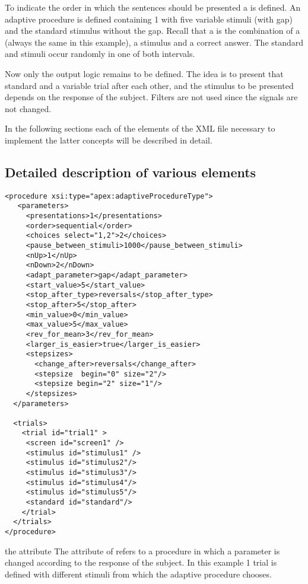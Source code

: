 To indicate the order in which the sentences should be presented a
 is defined. An adaptive procedure is defined
containing 1  with five variable stimuli (with
gap) and the standard stimulus without the gap. Recall that a
 is the combination of a  (always
the same in this example), a stimulus and a correct answer. The
standard and stimuli occur randomly in one of both intervals.

Now only the output logic remains to be defined. The idea is to
present that standard and a variable trial after each other, and
the stimulus to be presented depends on the response of the
subject. Filters are not used since the signals are not changed.

In the following sections each of the elements of the XML file
necessary to implement the latter concepts will be described in
detail.

\subsection{Detailed description of various elements}

\begin{lstlisting}
<procedure xsi:type="apex:adaptiveProcedureType">
   <parameters>
     <presentations>1</presentations>
     <order>sequential</order>
     <choices select="1,2">2</choices>
     <pause_between_stimuli>1000</pause_between_stimuli>
     <nUp>1</nUp>
     <nDown>2</nDown>
     <adapt_parameter>gap</adapt_parameter>
     <start_value>5</start_value>
     <stop_after_type>reversals</stop_after_type>
     <stop_after>5</stop_after>
     <min_value>0</min_value>
     <max_value>5</max_value>
     <rev_for_mean>3</rev_for_mean>
     <larger_is_easier>true</larger_is_easier>
     <stepsizes>
       <change_after>reversals</change_after>
       <stepsize  begin="0" size="2"/>
       <stepsize begin="2" size="1"/>
     </stepsizes>
  </parameters>

  <trials>
    <trial id="trial1" >
     <screen id="screen1" />
     <stimulus id="stimulus1" />
     <stimulus id="stimulus2"/>
     <stimulus id="stimulus3"/>
     <stimulus id="stimulus4"/>
     <stimulus id="stimulus5"/>
     <standard id="standard"/>
    </trial>
  </trials>
</procedure>
\end{lstlisting}


 the attribute The attribute
 of 
refers to a procedure in which a parameter is changed according to
the response of the subject. In this example 1 trial is defined
with different stimuli from which the adaptive procedure chooses.

